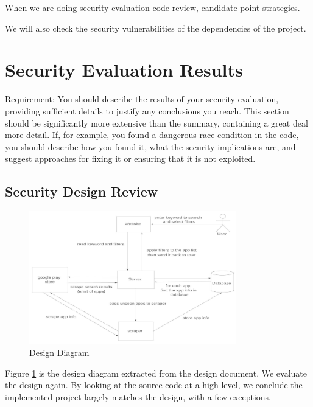 \documentclass[12pt, a4paper]{article}
\begin{document}
When we are doing security evaluation code review, candidate point strategies.

We will also check the security vulnerabilities of the dependencies of the project.



\section{Security Evaluation Results}

Requirement: You should describe the results of your security evaluation, providing sufficient details to justify any conclusions you reach. This section should be significantly more extensive than the summary, containing a great deal more detail. If, for example, you found a dangerous race condition in the code, you should describe how you found it, what the security implications are, and suggest approaches for fixing it or ensuring that it is not exploited. 

\subsection{Security Design Review}
\begin{figure}[ht]
\centering
\includegraphics[width=0.8\textwidth]{Context_Diagram.jpeg}
\caption{Design Diagram}
\label{fig:design_diagram}
\end{figure}

Figure \ref{fig:design_diagram} is the design diagram extracted from the design document. We evaluate the design again. By looking at the source code at a high level, we conclude the implemented project largely matches the design, with a few exceptions.
\end{document}
